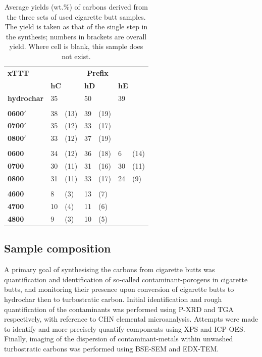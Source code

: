\begin{table}[t!]
    \caption{Average yields (wt.\%) of carbons derived from the three sets of used cigarette butt samples. The yield is taken as that of the single step in the synthesis; numbers in brackets are overall yield. Where cell is blank, this sample does not exist.}
    \label{tb:cb_yield}
    \begin{tabularx}{\textwidth}{llXlXlX}
        \toprule
            \textbf{xTTT} & \multicolumn{6}{c}{\textbf{Prefix}} \\
            & \multicolumn{2}{l}{\textbf{hC}} & \multicolumn{2}{l}{\textbf{hD}} & \multicolumn{2}{l}{\textbf{hE}} \\ 
        \midrule
            \textbf{hydrochar}  & 35 & & 50 & & 39 & \\
        \\
            \textbf{0600$'$} & 38 & (13) & 39 & (19) & & \\
            \textbf{0700$'$} & 35 & (12) & 33 & (17) & & \\
            \textbf{0800$'$} & 33 & (12) & 37 & (19) & & \\
        \\
            \textbf{0600} & 34 & (12) & 36 & (18) & 6 & (14) \\
            \textbf{0700} & 30 & (11) & 31 & (16) & 30 & (11)\\
            \textbf{0800} & 31 & (11) & 33 & (17) & 24 & (9)\\
        \\
            \textbf{4600} & 8 & (3) & 13 & (7) & & \\
            \textbf{4700} & 10 & (4) & 11 & (6) & & \\
            \textbf{4800} & 9 & (3) & 10 & (5) & & \\
        \bottomrule
    \end{tabularx}%
\end{table}


\subsection{Sample composition}

A primary goal of synthesising the carbons from cigarette butts was quantification and identification of so-called contaminant-porogens in cigarette butts, and monitoring their presence upon conversion of cigarette butts to hydrochar then to turbostratic carbon. Initial identification and rough quantification of the contaminants was performed using P-XRD and TGA respectively, with reference to CHN elemental microanalysis. Attempts were made to identify and more precisely quantify components using XPS and ICP-OES. Finally, imaging of the dispersion of contaminant-metals within unwashed turbostratic carbons was performed using BSE-SEM and EDX-TEM.

